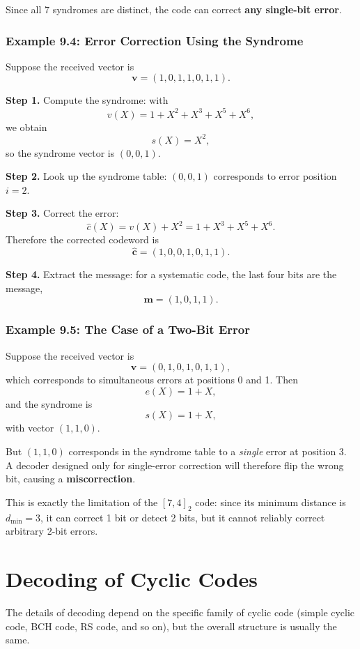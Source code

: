 \documentclass[11pt,oneside]{book}
\theoremstyle{plain}
\theoremstyle{definition}
\theoremstyle{remark}
\begin{document}
Since all 7 syndromes are distinct, the code can correct \textbf{any
single-bit error}.

\subsubsection{Example 9.4: Error Correction Using the
Syndrome}\label{example-9.4-error-correction-using-the-syndrome}

Suppose the received vector is \[\mathbf{v}=(1,0,1,1,0,1,1).\]

\textbf{Step 1.} Compute the syndrome: with \[v(X)=1+X^2+X^3+X^5+X^6,\]
we obtain \[s(X)=X^2,\] so the syndrome vector is \((0,0,1)\).

\textbf{Step 2.} Look up the syndrome table: \((0,0,1)\) corresponds to
error position \(i=2\).

\textbf{Step 3.} Correct the error:
\[\hat{c}(X)=v(X)+X^2 = 1+X^3+X^5+X^6.\] Therefore the corrected
codeword is \[\hat{\mathbf{c}}=(1,0,0,1,0,1,1).\]

\textbf{Step 4.} Extract the message: for a systematic code, the last
four bits are the message, \[\mathbf{m}=(1,0,1,1).\]

\subsubsection{Example 9.5: The Case of a Two-Bit
Error}\label{example-9.5-the-case-of-a-two-bit-error}

Suppose the received vector is \[\mathbf{v}=(0,1,0,1,0,1,1),\] which
corresponds to simultaneous errors at positions 0 and 1. Then
\[e(X)=1+X,\] and the syndrome is \[s(X)=1+X,\] with vector \((1,1,0)\).

But \((1,1,0)\) corresponds in the syndrome table to a \emph{single}
error at position 3. A decoder designed only for single-error correction
will therefore flip the wrong bit, causing a \textbf{miscorrection}.

This is exactly the limitation of the \([7,4]_2\) code: since its
minimum distance is \(d_{\min}=3\), it can correct 1 bit or detect 2
bits, but it cannot reliably correct arbitrary 2-bit errors.


\section{Decoding of Cyclic Codes}\label{sec:decoding}

The details of decoding depend on the specific family of cyclic code
(simple cyclic code, BCH code, RS code, and so on), but the overall
structure is usually the same.
\end{document}
